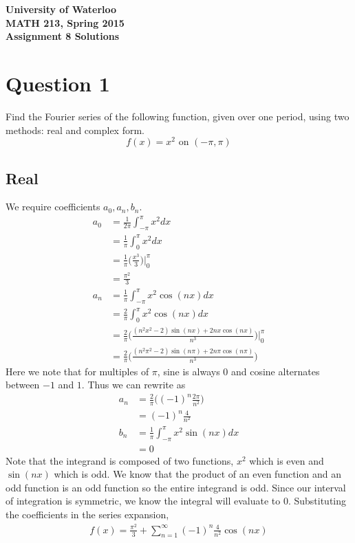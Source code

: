 \documentclass[12pt]{article}
\begin{document}
\begin{center}
{\Large\bf University of Waterloo}\\
\vspace{3mm}
{\Large\bf MATH 213, Spring 2015}\\
\vspace{2mm}
{\Large\bf Assignment 8 Solutions}\\
\end{center}

\section*{Question 1}
Find the Fourier series of the following function, given over one period, using two methods: real and complex form.
$$f(x) = x^2 \text{ on } (-\pi, \pi)$$

\subsection*{Real}
We require coefficients $a_0, a_n, b_n$.
\begin{align*}
  a_0 &= \frac{1}{2\pi}\int_{-\pi}^{\pi}x^2 dx \\
  &= \frac{1}{\pi}\int_{0}^{\pi}x^2 dx \tag{even integrand} \\
  &= \frac{1}{\pi} \bigg(\frac{x^3}{3}\bigg) \bigg|_0^{\pi} \\
  &= \frac{\pi^2}{3} \tag{1 mark} \\
  a_n &= \frac{1}{\pi}\int_{-\pi}^{\pi}x^2\cos(nx) dx \\
  &= \frac{2}{\pi}\int_{0}^{\pi}x^2\cos(nx) dx \tag{even integrand} \\
  &= \frac{2}{\pi} \bigg( \frac{(n^2x^2-2)\sin(nx) + 2nx\cos(nx)}{n^3}\bigg) \bigg|_0^{\pi} \\
  &= \frac{2}{\pi} \bigg( \frac{(n^2\pi^2-2)\sin(n\pi) + 2n\pi\cos(n\pi)}{n^3}\bigg) \tag{1 mark}
\end{align*}
Here we note that for multiples of $\pi$, sine is always 0 and cosine alternates between $-1$ and $1$. Thus we can rewrite as
\begin{align*}
  a_n &= \frac{2}{\pi} \bigg( (-1)^n \frac{2\pi}{n^2}\bigg) \\
  &= (-1)^n \frac{4}{n^2} \\
    b_n &= \frac{1}{\pi}\int_{-\pi}^{\pi}x^2\sin(nx) dx \tag{odd integrand}\\
       &= 0 \tag{1 mark}
\end{align*}
Note that the integrand is composed of two functions, $x^2$ which is even and $\sin(nx)$ which is odd. We know that the product of an even function and an odd function is an odd function so the entire integrand is odd. Since our interval of integration is symmetric, we know the integral will evaluate to $0$.
Substituting the coefficients in the series expansion,
\begin{align*}
    f(x) = \frac{\pi^2}{3} + \sum_{n=1}^{\infty} (-1)^n \frac{4}{n^2} \cos(nx) \tag{1 mark}
\end{align*}
\end{document}
